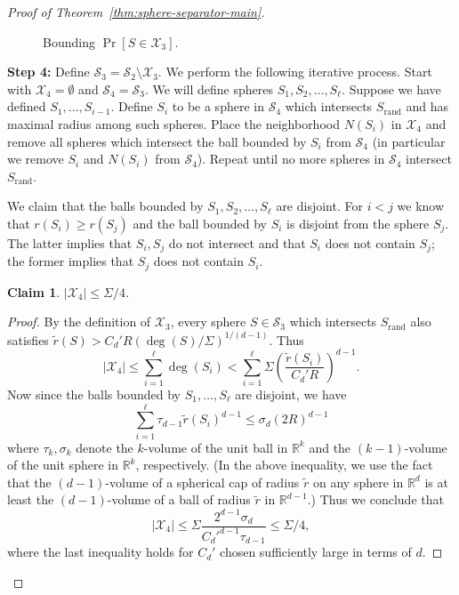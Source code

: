 \documentclass[11pt, reqno]{amsart}
\theoremstyle{plain}
\newtheorem{claim}[theorem]{Claim}
\theoremstyle{definition}
\theoremstyle{remark}
\numberwithin{theorem}{section}
\numberwithin{equation}{section}
\newcommand{\paren}[1]{\left( #1 \right)}
\newcommand{\R}{\mathbb R}
\newcommand{\fS}{\mathcal S}
\newcommand{\fX}{\mathcal X}
\begin{document}
\begin{proof}[Proof of Theorem~\ref{thm:sphere-separator-main}]
\begin{figure}
\caption{\label{fig:expected-x3-size}
Bounding $\Pr[S\in\fX_3]$.}
\end{figure}

\vspace{5pt} \noindent \textbf{Step 4:} Define $\fS_3=\fS_2\setminus \fX_3$. We perform the following iterative process. Start with $\fX_4=\emptyset$ and $\fS_4=\fS_3$. We will define spheres $S_1,S_2,\ldots,S_\ell$. Suppose we have defined $S_1,\ldots, S_{i-1}$. Define $S_i$ to be a sphere in $\fS_4$ which intersects $S_{\mathrm{rand}}$ and has maximal radius among such spheres. Place the neighborhood $N(S_i)$ in $\fX_4$ and remove all spheres which intersect the ball bounded by $S_i$ from $\fS_4$ (in particular we remove $S_i$ and $N(S_i)$ from $\fS_4$). Repeat until no more spheres in $\fS_4$ intersect $S_{\mathrm{rand}}$.

We claim that the balls bounded by $S_1,S_2,\ldots,S_\ell$ are disjoint. For $i<j$ we know that $r(S_i)\geq r(S_j)$ and the ball bounded by $S_i$ is disjoint from the sphere $S_j$. The latter implies that $S_i,S_j$ do not intersect and that $S_i$ does not contain $S_j$; the former implies that $S_j$ does not contain $S_i$. 

\begin{claim}
\label{claim:x4-size}
$|\fX_4|\leq\Sigma/4$.
\end{claim}
\begin{proof}
By the definition of $\fX_3$, every sphere $S\in\fS_3$ which intersects $S_{\mathrm{rand}}$ also satisfies $\tilde r(S)>C_d'R(\deg(S)/\Sigma)^{1/(d-1)}$. Thus
\[|\fX_4|\leq\sum_{i=1}^\ell\deg(S_i)<\sum_{i=1}^\ell\Sigma\paren{\frac{\tilde r(S_i)}{C_d' R}}^{d-1}.\]
Now since the balls bounded by $S_1,\ldots,S_\ell$ are disjoint, we have
\[\sum_{i=1}^\ell \tau_{d-1}\tilde r(S_i)^{d-1}\leq \sigma_d (2R)^{d-1}\]
where $\tau_k,\sigma_k$ denote the $k$-volume of the unit ball in $\R^k$ and the $(k-1)$-volume of the unit sphere in $\R^k$, respectively. (In the above inequality, we use the fact that the $(d-1)$-volume of a spherical cap of radius $\tilde r$ on any sphere in $\R^d$ is at least the $(d-1)$-volume of a ball of radius $\tilde r$ in $\R^{d-1}$.) Thus we conclude that
\[|\fX_4|\leq \Sigma \frac{2^{d-1}\sigma_d}{C_d'^{d-1}\tau_{d-1}}\leq\Sigma/4,\]
where the last inequality holds for $C_d'$ chosen sufficiently large in terms of $d$.
\end{proof}


\end{proof}
\end{document}
